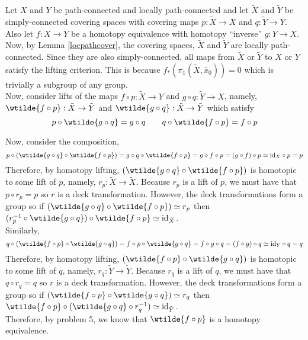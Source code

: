 \documentclass[12pt]{extarticle}
\begin{document}
Let $X$ and $Y$ be path-connected and locally path-connected and let $\tilde{X}$ and $\tilde{Y}$ be simply-connected covering spaces with covering maps $p : \tilde{X} \to X$ and $q : \tilde{Y} \to Y$. Also let $f : X \to Y$ be a homotopy equivalence with homotopy ``inverse'' $g : Y \to X$. Now, by Lemma \ref{locpathcover}, the covering spaces, $\tilde{X}$ and $\tilde{Y}$ are locally path-connected. Since they are also simply-connected, all maps from $\tilde{X}$ or $\tilde{Y}$ to $X$ or $Y$ satisfy the lifting criterion. This is because $f_*(\pi_1(\tilde{X}, \tilde{x_0})) = 0$ which is trivially a subgroup of any group. \bigskip \\
Now, consider lifts of the maps $f \circ p : \tilde{X} \to Y$ and $g \circ q : \tilde{Y} \to X$, namely, $\wtilde{f \circ p} : \tilde{X} \to \tilde{Y}$ and $\wtilde{g \circ q} : \tilde{X} \to \tilde{Y}$ which satisfy 
\[p \circ \wtilde{g \circ q} = g \circ q \quad \quad q \circ \wtilde{f \circ p} = f \circ p\]
\begin{center}
\end{center}
Now, consider the composition,
\[p \circ (\wtilde{g \circ q} \circ \wtilde{f \circ p}) = g \circ q \circ \wtilde{f \circ p} = g \circ f \circ p = (g \circ f) \circ p \simeq \id_X \circ p = p\]
Therefore, by homotopy lifting, $(\wtilde{g \circ q} \circ \wtilde{f \circ p})$ is homotopic to some lift of $p$, namely, $r_p : \tilde{X} \to \tilde{X}$. Because $r_p$ is a lift of $p$, we must have that $p \circ r_p = p$ so $r$ is a deck transformation. However, the deck transformations form a group so if $(\wtilde{g \circ q} \circ \wtilde{f \circ p}) \simeq r_p$ then $(r_p^{-1} \circ \wtilde{g \circ q}) \circ \wtilde{f \circ p} \simeq \id_{\tilde{X}}$. \bigskip \\
Similarly,
\[q \circ (\wtilde{f \circ p} \circ \wtilde{g \circ q} ) = f \circ p \circ \wtilde{g \circ q} = f \circ g \circ q = (f \circ g) \circ q \simeq \id_Y \circ q = q\]
Therefore, by homotopy lifting, $(\wtilde{f \circ p} \circ \wtilde{g \circ q})$ is homotopic to some lift of $q$, namely, $r_q : \tilde{Y} \to \tilde{Y}$. Because $r_q$ is a lift of $q$, we must have that $q \circ r_q = q$ so $r$ is a deck transformation. 
However, the deck transformations form a group so if $(\wtilde{f \circ p} \circ \wtilde{g \circ q}) \simeq r_q$ then $\wtilde{f \circ p} \circ (\wtilde{g \circ q} \circ r_q^{-1}) \simeq \id_{\tilde{Y}}$. \bigskip \\
Therefore, by problem 5, we know that $\wtilde{f \circ p}$ is a homotopy equivalence.
\end{document}
